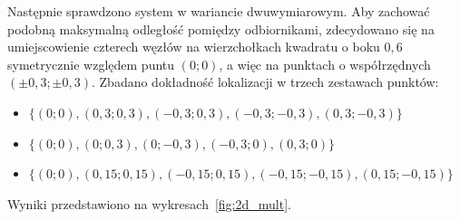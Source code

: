 Następnie sprawdzono system w wariancie dwuwymiarowym. Aby zachować podobną maksymalną odległość pomiędzy odbiornikami, zdecydowano się na umiejscowienie czterech węzłów na wierzchołkach kwadratu o boku $0,6$ symetrycznie względem puntu $(0;0)$, a więc na punktach o współrzędnych $(\pm0,3; \pm0,3)$. Zbadano dokładność lokalizacji w trzech zestawach punktów:

\begin{itemize}
    \item $\{(0;0), (0,3;0,3), (-0,3;0,3), (-0,3;-0,3), (0,3;-0,3)\}$
    \item $\{(0;0), (0;0,3), (0;-0,3), (-0,3;0), (0,3;0)\}$
    \item $\{(0;0), (0,15;0,15), (-0,15;0,15), (-0,15;-0,15), (0,15;-0,15)\}$
\end{itemize}
Wyniki przedstawiono na wykresach~\ref{fig:2d_mult}.

